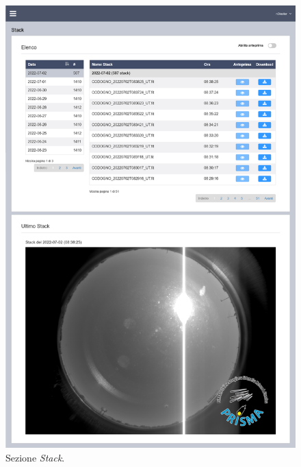 \begin{figure}[H]
    \begin{center}
    \includegraphics[width=\textwidth]{images/full-stacks.png}
    \caption{Sezione \emph{Stack}.}
    \label{fig:stack}
    \end{center}
\end{figure}